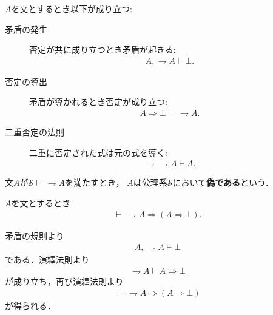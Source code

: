 	\begin{screen}
		\begin{logicalaxm}[矛盾と否定に関する規則]\label{logicalaxm:rules_of_contradiction}
			$A$を文とするとき以下が成り立つ:
			\begin{description}
				\item[矛盾の発生] 否定が共に成り立つとき矛盾が起きる:
					\begin{align}
						A, \rightharpoondown A \vdash \bot.
					\end{align}
				\item[否定の導出] 矛盾が導かれるとき否定が成り立つ:
					\begin{align}
						A \Longrightarrow \bot \vdash\ \rightharpoondown A.
					\end{align}
				\item[二重否定の法則] 二重に否定された式は元の式を導く:
					\begin{align}
						\rightharpoondown \rightharpoondown A \vdash A.
					\end{align}
			\end{description}
		\end{logicalaxm}
	\end{screen}
	
	文$A$が$\mathscr{S} \vdash\ \rightharpoondown A$を満たすとき，
	$A$は公理系$\mathscr{S}$において{\bf 偽である}という．
	
	\begin{screen}
		\begin{logicalthm}[偽な式は矛盾を導く]\label{logicalthm:false_and_negation_are_equivalent}
			$A$を文とするとき
			\begin{align}
				\vdash\ \rightharpoondown A \Longrightarrow (A \Longrightarrow \bot).
			\end{align}
		\end{logicalthm}
	\end{screen}
	
	\begin{prf}
		矛盾の規則より
		\begin{align}
			A,\rightharpoondown A \vdash \bot
		\end{align}
		である．演繹法則より
		\begin{align}
			\rightharpoondown A \vdash A \Longrightarrow \bot
		\end{align}
		が成り立ち，再び演繹法則より
		\begin{align}
			\vdash\ \rightharpoondown A \Longrightarrow (A \Longrightarrow \bot)
		\end{align}
		が得られる．
		\QED
	\end{prf}
	
